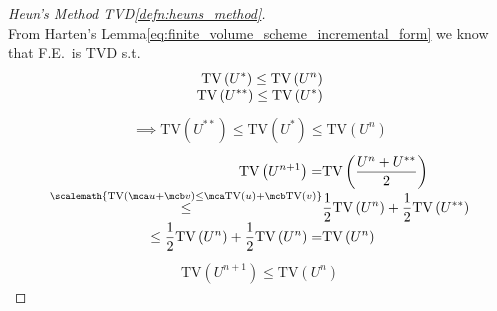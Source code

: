 \begin{proofbox}\nospacing
    \begin{proof}[Heun's Method TVD\cref{defn:heuns_method}]\label{proof:defn:heuns_method_tvd}\leavevmode\\
          From Harten's Lemma\cref{eq:finite_volume_scheme_incremental_form} we know that F.E.\ is TVD s.t.\
          \begin{align*}
            \text{TV}\left(U^{*}\right)\leq\text{TV}\left(U^{n}\right)\\[-1\jot]
            \text{TV}\left(U^{**}\right)\leq\text{TV}\left(U^{*}\right)
          \end{align*}
          \begin{align*}
            \implies\text{TV}\left(U^{**}\right)\leq\text{TV}\left(U^{*}\right)\leq\text{TV}\left(U^{n}\right)
          \end{align*}
          \begin{align*}
            \text{TV}\left(U^{n+1}\right)=&\text{TV}\left(\frac{U^{n}+U^{**}}{2}\right)\\[-1\jot]
            \vspace{-2em}\stackrel{\scalemath{\text{TV}(\mca u+\mcb v)\leq\mca \text{TV}(u)+\mcb \text{TV}(v)}}{\leq}&\frac{1}{2}\text{TV}\left(U^{n}\right)+\frac{1}{2}\text{TV}\left(U^{**}\right)\\[-1\jot]
            \leq\frac{1}{2}\text{TV}\left(U^{n}\right)+\frac{1}{2}\text{TV}\left(U^{n}\right)=&\text{TV}\left(U^{n}\right)
          \end{align*}
          \begin{align*}
            \text{TV}\left(U^{n+1}\right)\leq\text{TV}\left(U^{n}\right)
          \end{align*}
    \end{proof}
\end{proofbox}

